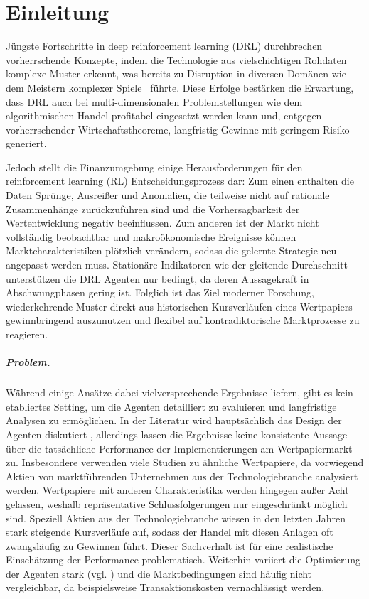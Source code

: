 \chapter{Einleitung}
\label{ch:einleitung}

Jüngste Fortschritte in deep reinforcement learning (\acs{DRL}) durchbrechen vorherrschende Konzepte, indem die Technologie aus vielschichtigen Rohdaten komplexe Muster erkennt, was bereits zu Disruption in diversen Domänen wie dem Meistern komplexer Spiele~\parencite{AlphaGo,antari} führte.
Diese Erfolge bestärken die Erwartung, dass \acs{DRL} auch bei multi-dimensionalen Problemstellungen wie dem algorithmischen Handel profitabel eingesetzt werden kann und, entgegen vorherrschender Wirtschaftstheoreme, langfristig Gewinne mit geringem Risiko generiert.

Jedoch stellt die Finanzumgebung einige Herausforderungen für den reinforcement learning (\acs{RL}) Entscheidungsprozess dar: Zum einen enthalten die Daten Sprünge, Ausrei\ss{}er und Anomalien, die teilweise nicht auf rationale Zusammenhänge zurückzuführen sind und die Vorhersagbarkeit der Wertentwicklung negativ beeinflussen. Zum anderen ist der Markt nicht vollständig beobachtbar und makroökonomische Ereignisse können Marktcharakteristiken plötzlich verändern, sodass die gelernte Strategie neu angepasst werden muss.
Stationäre Indikatoren wie der gleitende Durchschnitt unterstützen die \acs{DRL} Agenten nur bedingt, da deren Aussagekraft in Abschwungphasen gering ist. 
Folglich ist das Ziel moderner Forschung, wiederkehrende Muster direkt aus historischen Kursverläufen eines Wertpapiers gewinnbringend auszunutzen und flexibel auf kontradiktorische Marktprozesse zu reagieren.

\paragraph{Problem.} Während einige Ansätze \parencite{zhang2019deep,moodysaffell,duel} dabei vielversprechende Ergebnisse liefern, gibt es kein etabliertes Setting, um die Agenten detailliert zu evaluieren und langfristige Analysen zu ermöglichen.
In der Literatur wird hauptsächlich das Design der Agenten diskutiert \parencite{deepQtrader,9040728}, allerdings lassen die Ergebnisse keine konsistente Aussage über die tatsächliche Performance der Implementierungen am Wertpapiermarkt zu.
Insbesondere verwenden viele Studien \parencite{deepQtrader,huang2018financial,repo1,startrader} zu ähnliche Wertpapiere, da vorwiegend Aktien von marktführenden Unternehmen aus der Technologiebranche analysiert werden.
Wertpapiere mit anderen Charakteristika werden hingegen au\ss{}er Acht gelassen, weshalb repräsentative Schlussfolgerungen nur eingeschränkt möglich sind.
Speziell Aktien aus der Technologiebranche wiesen in den letzten Jahren stark steigende Kursverläufe auf, sodass der Handel mit diesen Anlagen oft zwangsläufig zu Gewinnen führt. Dieser Sachverhalt ist für eine realistische Einschätzung der Performance problematisch. 
Weiterhin variiert die Optimierung der Agenten stark (vgl. \parencite{théate2020application,repo2,huang2018financial}) und die Marktbedingungen sind häufig nicht vergleichbar, da beispielsweise Transaktionskosten \parencite{repo1,deepQtrader} vernachlässigt werden. 

